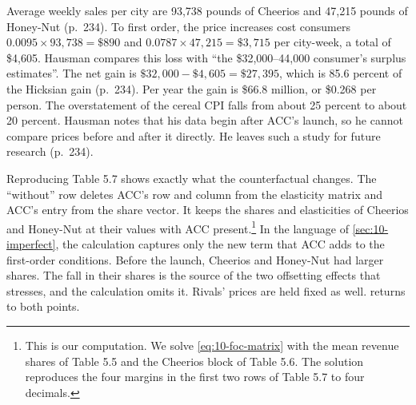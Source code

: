 Average weekly sales per city are 93,738 pounds of Cheerios and 47,215 pounds of Honey-Nut (p.~234). To first
order, the price increases cost consumers $0.0095 \times 93{,}738 = \$890$ and $0.0787 \times 47{,}215 =
\$3{,}715$ per city-week, a total of \$4,605. Hausman compares this loss with ``the \$32,000--44,000 consumer's
surplus estimates''. The net gain is $\$32{,}000 - \$4{,}605 = \$27{,}395$, which is 85.6 percent of the
Hicksian gain (p.~234). Per year the gain is \$66.8 million, or \$0.268 per person. The overstatement of the
cereal CPI falls from about 25 percent to about 20 percent. Hausman notes that his data begin after ACC's
launch, so he cannot compare prices before and after it directly. He leaves such a study for future research
(p.~234).

Reproducing Table 5.7 shows exactly what the counterfactual changes. The ``without'' row deletes ACC's row and
column from the elasticity matrix and ACC's entry from the share vector. It keeps the shares and elasticities
of Cheerios and Honey-Nut at their values with ACC present.\footnote{This is our computation. We solve
\eqref{eq:10-foc-matrix} with the mean revenue shares of Table 5.5 and the Cheerios block of Table 5.6. The
solution reproduces the four margins in the first two rows of Table 5.7 to four decimals.} In the language of
\cref{sec:10-imperfect}, the calculation captures only the new term that ACC adds to the first-order
conditions. Before the launch, Cheerios and Honey-Nut had larger shares. The fall in their shares is the
source of the two offsetting effects that \citet{Bresnahan1997} stresses, and the calculation omits it.
Rivals' prices are held fixed as well. 
returns to both points.

